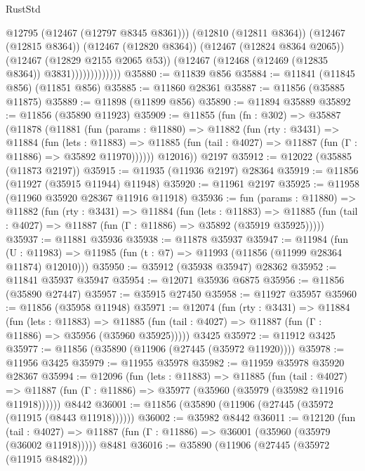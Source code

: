 \begin{lexlean}{RustStd}
\begin{coremodule}
                            @12795
                            (@12467 (@12797 @8345 @8361)))
                          (@12810 (@12811 @8364))
                          (@12467 (@12815 @8364))
                          (@12467 (@12820 @8364))
                          (@12467 (@12824 @8364 @2065))
                          (@12467 (@12829 @2155 @2065 @53))
                          (@12467 (@12468 (@12469 (@12835 @8364)) @3831)))))))))))))
@35880 := @11839 @856
@35884 := @11841 (@11845 @856) (@11851 @856)
@35885 := @11860 @28361
@35887 := @11856 (@35885 @11875)
@35889 := @11898 (@11899 @856)
@35890 := @11894 @35889
@35892 := @11856 (@35890 @11923)
@35909 := @11855
    (fun (fn : @302) =>
    @35887
      (@11878
        (@11881
          (fun (params : @11880) =>
          @11882
            (fun (rty : @3431) =>
            @11884
              (fun (lets : @11883) =>
              @11885 (fun (tail : @4027) => @11887 (fun (Γ : @11886) => @35892 @11970))))))
        @12016))
    @2197
@35912 := @12022 (@35885 (@11873 @2197))
@35915 := @11935 (@11936 @2197) @28364
@35919 := @11856 (@11927 (@35915 @11944) @11948)
@35920 := @11961 @2197
@35925 := @11958 (@11960 @35920 @28367 @11916 @11918)
@35936 := fun (params : @11880) =>
  @11882
    (fun (rty : @3431) =>
    @11884
      (fun (lets : @11883) =>
      @11885 (fun (tail : @4027) => @11887 (fun (Γ : @11886) => @35892 (@35919 @35925)))))
@35937 := @11881 @35936
@35938 := @11878 @35937
@35947 := @11984
    (fun (U : @11983) => @11985 (fun (t : @7) => @11993 (@11856 (@11999 @28364 @11874) @12010)))
@35950 := @35912 (@35938 @35947) @28362
@35952 := @11841 @35937 @35947
@35954 := @12071 @35936 @6875
@35956 := @11856 (@35890 @27447)
@35957 := @35915 @27450
@35958 := @11927 @35957
@35960 := @11856 (@35958 @11948)
@35971 := @12074
    (fun (rty : @3431) =>
    @11884
      (fun (lets : @11883) =>
      @11885 (fun (tail : @4027) => @11887 (fun (Γ : @11886) => @35956 (@35960 @35925)))))
    @3425
@35972 := @11912 @3425
@35977 := @11856 (@35890 (@11906 (@27445 (@35972 @11920))))
@35978 := @11956 @3425
@35979 := @11955 @35978
@35982 := @11959 @35978 @35920 @28367
@35994 := @12096
    (fun (lets : @11883) =>
    @11885
      (fun (tail : @4027) =>
      @11887 (fun (Γ : @11886) => @35977 (@35960 (@35979 (@35982 @11916 @11918))))))
    @8442
@36001 := @11856 (@35890 (@11906 (@27445 (@35972 (@11915 (@8443 @11918))))))
@36002 := @35982 @8442
@36011 := @12120
    (fun (tail : @4027) => @11887 (fun (Γ : @11886) => @36001 (@35960 (@35979 (@36002 @11918)))))
    @8481
@36016 := @35890 (@11906 (@27445 (@35972 (@11915 @8482))))

\end{coremodule}
\end{lexlean}
